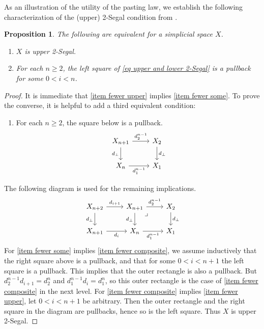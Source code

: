 \documentclass{amsart}
\newtheorem{proposition}[theorem]{Proposition}
\theoremstyle{definition}
\theoremstyle{remark}
\begin{document}
As an illustration of the utility of the pasting law, we establish the following characterization of the (upper) 2-Segal condition from \cite[Lemma 3.6]{GKT1}.

\begin{proposition}\label{prop fewer squares}
The following are equivalent for a simplicial space $X$.
\begin{enumerate}
\item $X$ is upper 2-Segal.\label{item fewer upper}
\item For each $n\geq 2$, the left square of \eqref{eq upper and lower 2-Segal} is a pullback for some $0 < i < n$.\label{item fewer some}
\end{enumerate}
\end{proposition}
\begin{proof}
It is immediate that \eqref{item fewer upper} implies \eqref{item fewer some}.
To prove the converse, it is helpful to add a third equivalent condition:
\begin{enumerate}[start=3]
\item For each $n\geq 2$, the square below is a pullback.\label{item fewer composite}
\[ \begin{tikzcd}
X_{n+1} \rar{d_2^{n-1}} \dar[swap]{d_\bot} & X_2 \dar{d_\bot} \\
X_n \rar[swap]{d_1^{n-1}} & X_1
\end{tikzcd} \]
\end{enumerate}
The following diagram is used for the remaining implications.
\[ \begin{tikzcd}
X_{n+2} \rar{d_{i+1}} \dar[swap]{d_\bot} &
X_{n+1} \rar{d_2^{n-1}} \dar[swap]{d_\bot} \ar[dr, phantom, "\lrcorner" very near start] & X_2 \dar{d_\bot}
\\
X_{n+1} \rar[swap]{d_i} & 
X_n \rar[swap]{d_1^{n-1}} & X_1
\end{tikzcd} \]
For \eqref{item fewer some} implies \eqref{item fewer composite}, we assume inductively that the right square above is a pullback, and that for some $0 < i < n+1$ the left square is a pullback. 
This implies that the outer rectangle is also a pullback.
But $d_2^{n-1}d_{i+1} = d_2^n$ and $d_1^{n-1}d_i = d_1^n$, so this outer rectangle is the case of \eqref{item fewer composite} in the next level.
For \eqref{item fewer composite} implies \eqref{item fewer upper}, let $0 < i < n+1$ be arbitrary. 
Then the outer rectangle and the right square in the diagram are pullbacks, hence so is the left square.
Thus $X$ is upper 2-Segal.
\end{proof}
\end{document}
